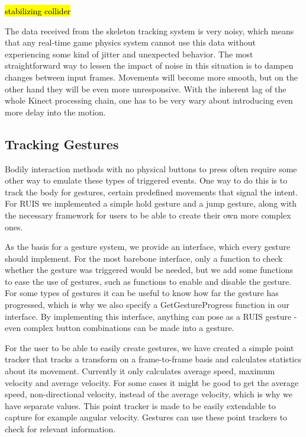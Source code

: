 \documentclass[12pt,a4paper,oneside,pdftex]{report}
\begin{document}
\hl{stabilizing collider}

The data received from the skeleton tracking system is very noisy, which means that any real-time game physics system cannot use this data without experiencing some kind of jitter and unexpected behavior. The most straightforward way to lessen the impact of noise in this situation is to dampen changes between input frames. Movements will become more smooth, but on the other hand they will be even more unresponsive. With the inherent lag of the whole Kinect processing chain, one has to be very wary about introducing even more delay into the motion.

\subsection{Tracking Gestures}
\label{subsection:skeletontracking:gestures}

Bodily interaction methods with no physical buttons to press often require some other way to emulate these types of triggered events. One way to do this is to track the body for gestures, certain predefined movements that signal the intent. For RUIS we implemented a simple hold gesture and a jump gesture, along with the necessary framework for users to be able to create their own more complex ones.

As the basis for a gesture system, we provide an interface, which every gesture should implement. For the most barebone interface, only a function to check whether the gesture was triggered would be needed, but we add some functions to ease the use of gestures, such as functions to enable and disable the gesture. For some types of gestures it can be useful to know how far the gesture has progressed, which is why we also specify a GetGestureProgress function in our interface. By implementing this interface, anything can pose as a RUIS gesture - even complex button combinations can be made into a gesture. 

For the user to be able to easily create gestures, we have created a simple point tracker that tracks a transform on a frame-to-frame basis and calculates statistics about its movement. Currently it only calculates average speed, maximum velocity and average velocity. For some cases it might be good to get the average speed, non-directional velocity, instead of the average velocity, which is why we have separate values. This point tracker is made to be easily extendable to capture for example angular velocity. Gestures can use these point trackers to check for relevant information.
\end{document}
